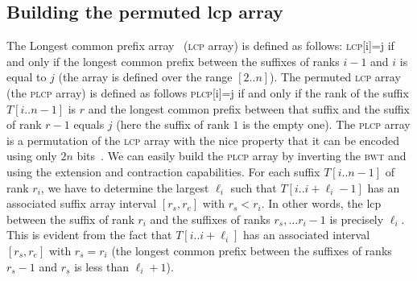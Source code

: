 \documentclass[a4paper]{article}
\begin{document}
\subsection{Building the permuted lcp array}
The Longest common prefix array~\cite{MM93} (\textsc{lcp} array) is defined as follows: \textsc{lcp}[i]=j if and only if the longest common prefix between the suffixes of ranks $i-1$ and $i$ is equal to $j$ (the array is defined over the range $[2..n]$). The permuted \textsc{lcp} array (the \textsc{plcp} array) is defined as follows \textsc{plcp}[i]=j if and only if the rank of the suffix $T[i..n-1]$ is $r$ and the longest common prefix between that suffix and the suffix of rank $r-1$ equals $j$ (here the suffix of rank $1$ is the empty one). The \textsc{plcp} array is a permutation of the \textsc{lcp} array with the nice property that it can be encoded using only $2n$ bits~\cite{Sa02}. 
We can easily build the \textsc{plcp} array by inverting the \textsc{bwt} and using the extension and contraction capabilities. For each suffix $T[i..n-1]$ of rank $r_i$, we have to determine the largest $\ell_i$ such that $T[i..i+\ell_i-1]$ has an associated suffix array interval $[r_s,r_e]$ with $r_s<r_i$. In other words, the lcp between the suffix of rank $r_i$ and the suffixes of ranks $r_s,\ldots r_i-1$ is precisely $\ell_i$. This is evident from the fact that $T[i..i+\ell_i]$ has an associated interval $[r_s,r_e]$ with $r_s=r_i$ (the longest common prefix between the suffixes of ranks $r_s-1$ and $r_s$ is less than $\ell_i+1$). 
\end{document}
